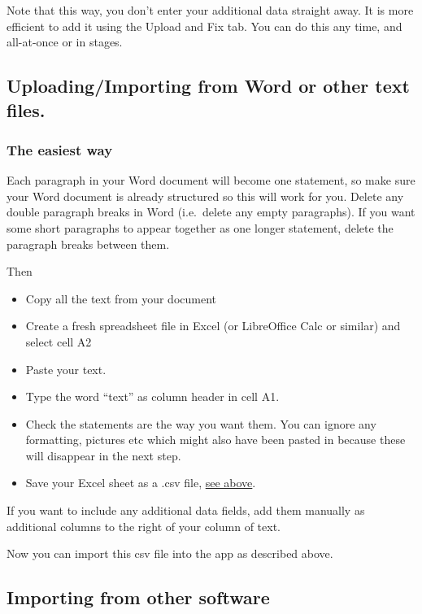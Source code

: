 \documentclass[
]{book}
\begin{document}
Note that this way, you don't enter your additional data straight away. It is more efficient to add it using the Upload and Fix tab. You can do this any time, and all-at-once or in stages.

\hypertarget{uploadingimporting-from-word-or-other-text-files.}{%
\subsection{Uploading/Importing from Word or other text files.}\label{uploadingimporting-from-word-or-other-text-files.}}

\hypertarget{the-easiest-way}{%
\subsubsection{The easiest way}\label{the-easiest-way}}

Each paragraph in your Word document will become one statement, so make sure your Word document is already structured so this will work for you. Delete any double paragraph breaks in Word (i.e.~delete any empty paragraphs). If you want some short paragraphs to appear together as one longer statement, delete the paragraph breaks between them.

Then

\begin{itemize}
\item
  Copy all the text from your document
\item
  Create a fresh spreadsheet file in Excel (or LibreOffice Calc or similar) and select cell A2
\item
  Paste your text.
\item
  Type the word ``text'' as column header in cell A1.
\item
  Check the statements are the way you want them. You can ignore any formatting, pictures etc which might also have been pasted in because these will disappear in the next step.
\item
  Save your Excel sheet as a .csv file, \protect\hyperlink{preparing-and-uploading-your-.csv-file}{see above}.
\end{itemize}

If you want to include any additional data fields, add them manually as additional columns to the right of your column of text.

Now you can import this csv file into the app as described above.

\hypertarget{importing-from-other-software}{%
\subsection{Importing from other software}\label{importing-from-other-software}}
\end{document}
